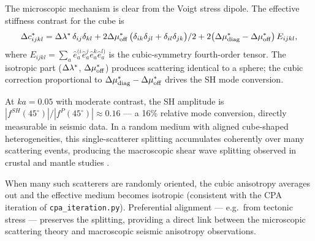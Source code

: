 The microscopic mechanism is clear from the Voigt stress dipole.  The
effective stiffness contrast for the cube is
\begin{equation}
  \Delta c^*_{ijkl}
  = \Delta\lambda^*\,\delta_{ij}\delta_{kl}
  + 2\Delta\mu^*_{\mathrm{off}}\,\bigl(\delta_{ik}\delta_{jl}
    + \delta_{il}\delta_{jk}\bigr)/2
  + 2\bigl(\Delta\mu^*_{\mathrm{diag}} - \Delta\mu^*_{\mathrm{off}}\bigr)\,
    E_{ijkl},
  \label{eq:Dc-cubic}
\end{equation}
where $E_{ijkl} = \sum_a \hat{e}_a^{(i}\hat{e}_a^{j}\hat{e}_a^{k}\hat{e}_a^{l)}$
is the cubic-symmetry fourth-order tensor.  The isotropic part
($\Delta\lambda^*$, $\Delta\mu^*_\mathrm{off}$) produces scattering identical
to a sphere; the cubic correction proportional to
$\Delta\mu^*_{\mathrm{diag}} - \Delta\mu^*_{\mathrm{off}}$ drives the SH
mode conversion.

At $ka = 0.05$ with moderate contrast, the SH amplitude is
$|f^{SH}(45^\circ)| / |f^P(45^\circ)| \approx 0.16$ --- a 16\%
relative mode conversion, directly measurable in seismic data.  In a
random medium with aligned cube-shaped heterogeneities, this
single-scatterer splitting accumulates coherently over many scattering
events, producing the macroscopic shear wave splitting
observed in crustal and mantle studies \cite{crampin1981,savage1999}.

When many such scatterers are randomly oriented, the cubic anisotropy
averages out and the effective medium becomes isotropic (consistent with
the CPA iteration of \texttt{cpa\_iteration.py}).  Preferential
alignment --- e.g.\ from tectonic stress --- preserves the splitting,
providing a direct link between the microscopic scattering
theory and macroscopic seismic anisotropy observations.

